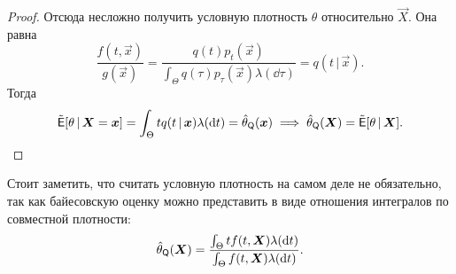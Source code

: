 \begin{proof}
    Отсюда несложно получить условную плотность $\theta$ относительно $\vec{X}$. Она равна
    \[
       \frac{f(t, \vec{x})}{g(\vec{x})} = \frac{q(t)p_{t}(\vec{x})}{\int_{\Theta} q(\tau)p_{\tau}(\vec{x}) \lambda(\dd \tau)} =  q(t\,|\,\vec{x}).
    \]
    Тогда
    \[
        \tilde{\operatorname{\mathsf{E}}}[\theta\,|\,\bm{X} = \bm{x}] = \int_{\Theta} tq(t\,|\,\bm{x})\lambda(\dd t) = \hat{\theta}_{\mathsf{Q}}(\bm{x}) \implies \hat{\theta}_{\mathsf{Q}}(\bm{X}) = \tilde{\operatorname{\mathsf{E}}}[\theta\,|\,\bm{X}]. \qedhere
    \]
\end{proof}
\begin{remark}
    Стоит заметить, что считать условную плотность на самом деле не обязательно, так как байесовскую оценку можно представить в виде отношения интегралов по совместной плотности:
    \[
        \hat{\theta}_{\mathsf{Q}}(\bm{X}) = \frac{\int_{\Theta} tf(t, \bm{X})\lambda(\dd t)}{\int_{\Theta} f(t, \bm{X})\lambda(\dd t)}.
    \]
\end{remark}

